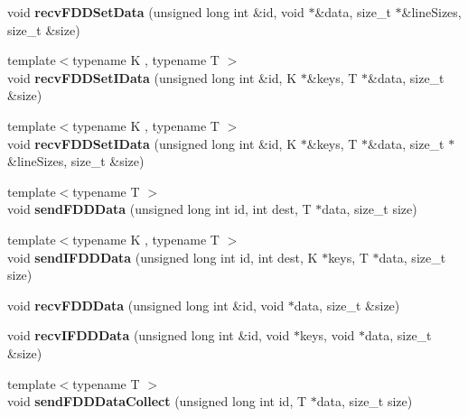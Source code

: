 \begin{DoxyCompactItemize}
void {\bfseries recv\+F\+D\+D\+Set\+Data} (unsigned long int \&id, void $\ast$\&data, size\+\_\+t $\ast$\&line\+Sizes, size\+\_\+t \&size)
\item 
\hypertarget{classfaster_1_1fastComm_ae234c6735666e85789aafc82120c0f0f}{}\label{classfaster_1_1fastComm_ae234c6735666e85789aafc82120c0f0f} 
{\footnotesize template$<$typename K , typename T $>$ }\\void {\bfseries recv\+F\+D\+D\+Set\+I\+Data} (unsigned long int \&id, K $\ast$\&keys, T $\ast$\&data, size\+\_\+t \&size)
\item 
\hypertarget{classfaster_1_1fastComm_a5f9da47ecd49c3456777bec1815c0600}{}\label{classfaster_1_1fastComm_a5f9da47ecd49c3456777bec1815c0600} 
{\footnotesize template$<$typename K , typename T $>$ }\\void {\bfseries recv\+F\+D\+D\+Set\+I\+Data} (unsigned long int \&id, K $\ast$\&keys, T $\ast$\&data, size\+\_\+t $\ast$\&line\+Sizes, size\+\_\+t \&size)
\item 
\hypertarget{classfaster_1_1fastComm_a0b67f926ff07626bec61c04fe3da36ef}{}\label{classfaster_1_1fastComm_a0b67f926ff07626bec61c04fe3da36ef} 
{\footnotesize template$<$typename T $>$ }\\void {\bfseries send\+F\+D\+D\+Data} (unsigned long int id, int dest, T $\ast$data, size\+\_\+t size)
\item 
\hypertarget{classfaster_1_1fastComm_aa26227cfe5edb65b68b9e0198ae69e94}{}\label{classfaster_1_1fastComm_aa26227cfe5edb65b68b9e0198ae69e94} 
{\footnotesize template$<$typename K , typename T $>$ }\\void {\bfseries send\+I\+F\+D\+D\+Data} (unsigned long int id, int dest, K $\ast$keys, T $\ast$data, size\+\_\+t size)
\item 
\hypertarget{classfaster_1_1fastComm_af880244a1924f6647f8c2d40a59853ef}{}\label{classfaster_1_1fastComm_af880244a1924f6647f8c2d40a59853ef} 
void {\bfseries recv\+F\+D\+D\+Data} (unsigned long int \&id, void $\ast$data, size\+\_\+t \&size)
\item 
\hypertarget{classfaster_1_1fastComm_a34a8ad79fda6a1146df90a13c14b95a3}{}\label{classfaster_1_1fastComm_a34a8ad79fda6a1146df90a13c14b95a3} 
void {\bfseries recv\+I\+F\+D\+D\+Data} (unsigned long int \&id, void $\ast$keys, void $\ast$data, size\+\_\+t \&size)
\item 
\hypertarget{classfaster_1_1fastComm_a708657fc9279d7a360a5f3102f91b36a}{}\label{classfaster_1_1fastComm_a708657fc9279d7a360a5f3102f91b36a} 
{\footnotesize template$<$typename T $>$ }\\void {\bfseries send\+F\+D\+D\+Data\+Collect} (unsigned long int id, T $\ast$data, size\+\_\+t size)

\end{DoxyCompactItemize}
